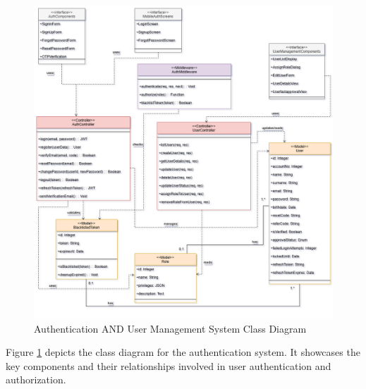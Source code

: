 \begin{figure}[htbp]
    \centering
    \includegraphics[width=1\textwidth]{images/auth_classdiag.PNG}
    \caption{Authentication AND User Management System Class Diagram}
    \label{fig:auth-class-diagram}
\end{figure}

Figure \ref{fig:auth-class-diagram} depicts the class diagram for the authentication system. It showcases the key components and their relationships involved in user authentication and authorization.

\newpage

